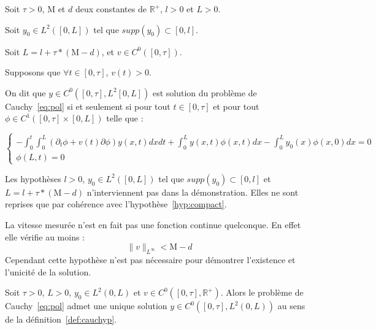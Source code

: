 \documentclass[a4paper]{article}
\newcommand{\mass}{\mathrm{M}}
\newcommand{\dep}{d}
\begin{document}
\begin{definition}
	\label{def:cauchyp}
	Soit $\tau>0$, $\mass$ et $\dep$ deux constantes de $\mathbb{R}^+$, 
	$l>0$ et $L>0$. 
	
	Soit $y_0 \in L^2([0,L])$ tel que $supp(y_0) \subset [0,l]$.
	
	Soit $L=l+\tau*(\mass-\dep)$, et $v \in C^0([0,\tau])$.
	
	Supposons que $\forall t \in[0,\tau]$, $v(t)>0$.
	
	On dit que $y \in C^0([0,\tau],L^2[0,L])$ est solution du problème de Cauchy~\eqref{eq:pol}  
	si et seulement si pour tout $t \in [0,\tau]$ et pour
	tout $\phi \in C^1([0,\tau]\times [0,L])$ telle que :
	
	\begin{equation}
		\begin{cases}
			-\int_0^t \int_0^L (\partial_t \phi +v(t)\partial \phi) y(x,t) dxdt 
			+ \int_0^L y(x,t) \phi (x,t) dx - \int_0^L y_0(x)\phi(x,0)dx =0 \\
			\phi(L,t)=0
		\end{cases}
	\end{equation}
	
\end{definition}

\begin{remarque}
	Les hypothèses $l>0$, $y_0 \in L^2([0,L])$ tel que $supp(y_0) \subset [0,l]$ et $L=l+\tau*(\mass-\dep)$ n'interviennent pas dans la démonstration. 
	Elles ne sont reprises que par cohérence avec l'hypothèse~\eqref{hyp:compact}.
\end{remarque}

\begin{remarque}
	La vitesse mesurée n'est en fait pas une fonction continue quelconque.
	En effet elle vérifie au moins :
	\[\|v\|_{L^{\infty}} < \mass-\dep \]
	Cependant cette hypothèse n'est pas nécessaire pour démontrer l'existence et l'unicité de la solution.
\end{remarque}

\begin{theoreme}
	Soit $\tau >0$, $L>0$, $y_0 \in L^2(0,L)$ et $v \in C^0([0,\tau],\mathbb{R}^+)$.
	Alors le problème de Cauchy~\eqref{eq:pol} admet une unique solution $y \in C^0([0,\tau],L^2(0,L))$ au sens de la définition~\ref{def:cauchyp}.
\end{theoreme}
\end{document}
